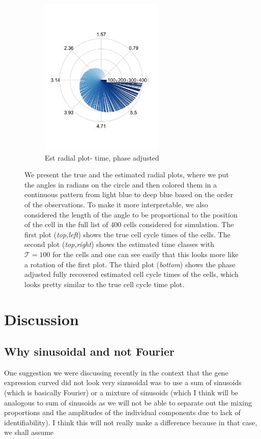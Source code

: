 \documentclass[11pt]{article}
\begin{document}
\begin{figure}[ht]
     \begin{subfigure}[t]{0.5\textwidth}
        \centering
        \includegraphics[height=3in]{../figures/cell_order_R_figs/estd_cell_order_phase_adjusted.png}
        \caption{Est radial plot- time, phase adjusted}
    \end{subfigure}
    \caption{We present the true and the estimated radial plots, where we put the angles in radians on the circle and then colored them in a continuous pattern from light blue  to deep blue based on the order of the observations. To make it more interpretable, we also considered the length of the angle to be proportional to the position of the cell in the full list of $400$ cells considered for simulation. The first plot (\textit{top,left}) shows the true cell cycle times of the cells. The second plot (\textit{top,right}) shows the estimated time classes with $\mathcal{T}=100$ for the cells and one can see easily that this looks more like a rotation of the first plot. The third plot (\textit{bottom}) shows the phase adjusted fully recovered estimated cell cycle times of the cells, which looks pretty similar to the true cell cycle time plot.}
 \label{fig:fig2}
 \end{figure}


\section{Discussion}

\subsection{Why sinusoidal and not Fourier}

One suggestion we were discussing recently in the context that the gene expression curved did not look very sinusoidal was to use  a sum of sinusoids (which is basically Fourier) or a mixture of sinusoids (which I think will be analogous to sum of sinusoids as we will not be able to separate out the mixing proportions and the amplitudes of the individual components due to lack of identifiability). I think this will not really make a difference because in that case, we shall assume 
\end{document}
